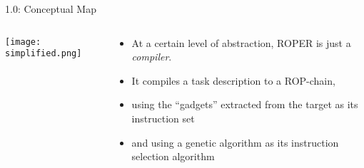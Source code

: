 \documentclass[9pt]{beamer}
\begin{document}
\begin{frame}{1.0: Conceptual Map}

\begin{columns}

\begin{column}{0.5\textwidth}
\texttt{[image: simplified.png]}

\end{column}

\begin{column}{.5\textwidth}

\begin{itemize}
    \item At a certain level of abstraction, ROPER is just a \emph{compiler}.
    \item It compiles a task description to a ROP-chain,
    \item using the ``gadgets'' extracted from the target as its instruction set
    \item and using a genetic algorithm as its instruction selection algorithm
\end{itemize}

\end{column}

\end{columns}

\end{frame}
\end{document}
